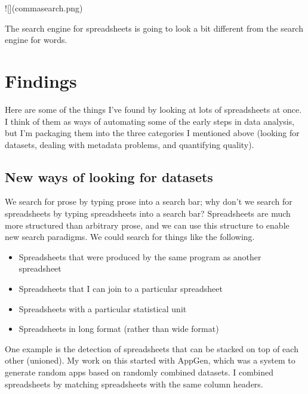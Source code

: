 \documentclass{acm_proc_article-sp}
\begin{document}
![](commasearch.png)

The search engine for spreadsheets is going to look a bit different from
the search engine for words.















\section{Findings}
Here are some of the things I've found by looking at lots of spreadsheets at
once. I think of them as ways of automating some of the early steps in data
analysis, but I'm packaging them into the three categories I mentioned above
(looking for datasets, dealing with metadata problems, and quantifying quality).

\subsection{New ways of looking for datasets}
We search for prose by typing prose into a search bar; why don't
we search for spreadsheets by typing spreadsheets into a search bar?
Spreadsheets are much more structured than arbitrary prose, and we
can use this structure to enable new search paradigms. We could search
for things like the following.

\begin{itemize}
\item Spreadsheets that were produced by the same program as another spreadsheet
\item Spreadsheets that I can join to a particular spreadsheet
\item Spreadsheets with a particular statistical unit
\item Spreadsheets in long format (rather than wide format)
\end{itemize}

One example is the detection of spreadsheets that can be stacked on top of
each other (unioned).
My work on this started with AppGen,\cite{appgen} which was a system to
generate random apps based on randomly combined datasets. I combined spreadsheets
by matching spreadsheets with the same column headers.
\end{document}
